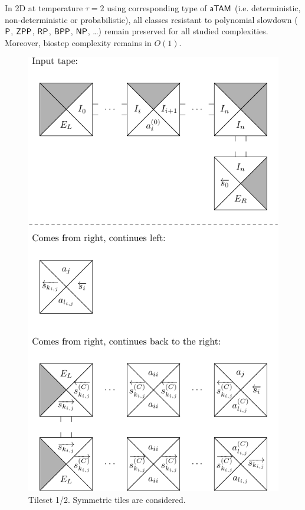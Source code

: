 	\begin{cor}
	\label{cor:poly_resist}
		
		In 2D at temperature $\tau = 2$ using corresponding type of $\atam$ (i.e. deterministic, non-deterministic or probabilistic), all classes resistant to polynomial slowdown ($\P$, $\ZPP$, $\RP$, $\BPP$, $\NP$, \ldots) remain preserved for all studied complexities. Moreover, biostep complexity remains in $O(1)$.
	\end{cor}
	
	\begin{figure}[h]
	\begin{center}
		\includegraphics{./figures/tiles1.pdf}
		\caption{Tileset 1/2. Symmetric tiles are considered.}
		\label{fig:tileset1}
	\end{center}
	\end{figure}
	
